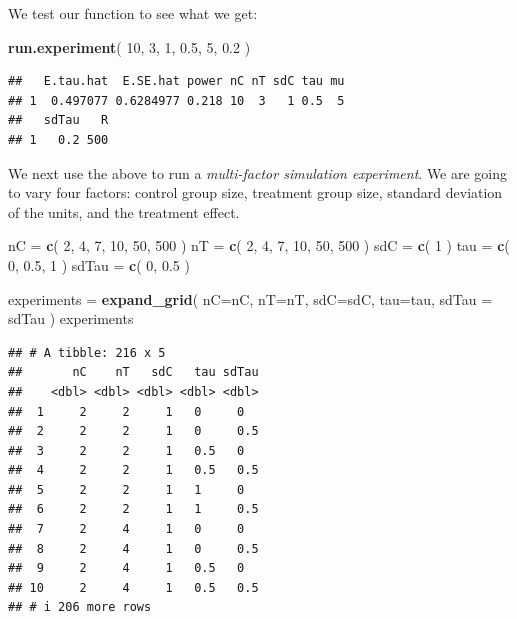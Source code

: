 \documentclass[
]{book}
\newenvironment{Shaded}{\begin{snugshade}}{\end{snugshade}}
\newcommand{\AttributeTok}[1]{\textcolor[rgb]{0.13,0.29,0.53}{#1}}
\newcommand{\DecValTok}[1]{\textcolor[rgb]{0.00,0.00,0.81}{#1}}
\newcommand{\FloatTok}[1]{\textcolor[rgb]{0.00,0.00,0.81}{#1}}
\newcommand{\FunctionTok}[1]{\textcolor[rgb]{0.13,0.29,0.53}{\textbf{#1}}}
\newcommand{\NormalTok}[1]{#1}
\newcommand{\OtherTok}[1]{\textcolor[rgb]{0.56,0.35,0.01}{#1}}
\begin{document}
We test our function to see what we get:

\begin{Shaded}
\begin{Highlighting}[]
\FunctionTok{run.experiment}\NormalTok{( }\DecValTok{10}\NormalTok{, }\DecValTok{3}\NormalTok{, }\DecValTok{1}\NormalTok{, }\FloatTok{0.5}\NormalTok{, }\DecValTok{5}\NormalTok{, }\FloatTok{0.2}\NormalTok{ )}
\end{Highlighting}
\end{Shaded}

\begin{verbatim}
##   E.tau.hat  E.SE.hat power nC nT sdC tau mu
## 1  0.497077 0.6284977 0.218 10  3   1 0.5  5
##   sdTau   R
## 1   0.2 500
\end{verbatim}

We next use the above to run a \emph{multi-factor simulation experiment}. We are
going to vary four factors: control group size, treatment group size,
standard deviation of the units, and the treatment effect.

\begin{Shaded}
\begin{Highlighting}[]
\NormalTok{nC }\OtherTok{=} \FunctionTok{c}\NormalTok{( }\DecValTok{2}\NormalTok{, }\DecValTok{4}\NormalTok{, }\DecValTok{7}\NormalTok{, }\DecValTok{10}\NormalTok{, }\DecValTok{50}\NormalTok{, }\DecValTok{500}\NormalTok{ )}
\NormalTok{nT }\OtherTok{=} \FunctionTok{c}\NormalTok{( }\DecValTok{2}\NormalTok{, }\DecValTok{4}\NormalTok{, }\DecValTok{7}\NormalTok{, }\DecValTok{10}\NormalTok{, }\DecValTok{50}\NormalTok{, }\DecValTok{500}\NormalTok{ )}
\NormalTok{sdC }\OtherTok{=} \FunctionTok{c}\NormalTok{( }\DecValTok{1}\NormalTok{ )}
\NormalTok{tau }\OtherTok{=} \FunctionTok{c}\NormalTok{( }\DecValTok{0}\NormalTok{, }\FloatTok{0.5}\NormalTok{, }\DecValTok{1}\NormalTok{ )}
\NormalTok{sdTau }\OtherTok{=} \FunctionTok{c}\NormalTok{( }\DecValTok{0}\NormalTok{, }\FloatTok{0.5}\NormalTok{ )}

\NormalTok{experiments }\OtherTok{=} \FunctionTok{expand\_grid}\NormalTok{( }\AttributeTok{nC=}\NormalTok{nC, }\AttributeTok{nT=}\NormalTok{nT, }\AttributeTok{sdC=}\NormalTok{sdC, }\AttributeTok{tau=}\NormalTok{tau, }\AttributeTok{sdTau =}\NormalTok{ sdTau )}
\NormalTok{experiments}
\end{Highlighting}
\end{Shaded}

\begin{verbatim}
## # A tibble: 216 x 5
##       nC    nT   sdC   tau sdTau
##    <dbl> <dbl> <dbl> <dbl> <dbl>
##  1     2     2     1   0     0  
##  2     2     2     1   0     0.5
##  3     2     2     1   0.5   0  
##  4     2     2     1   0.5   0.5
##  5     2     2     1   1     0  
##  6     2     2     1   1     0.5
##  7     2     4     1   0     0  
##  8     2     4     1   0     0.5
##  9     2     4     1   0.5   0  
## 10     2     4     1   0.5   0.5
## # i 206 more rows
\end{verbatim}
\end{document}
